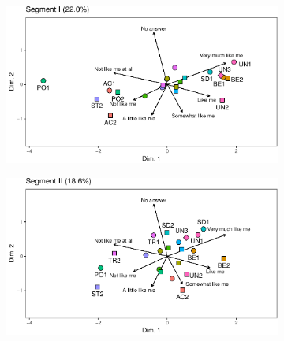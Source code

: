 \documentclass[12pt,letter]{article}\usepackage[]{graphicx}\usepackage[]{xcolor}
\begin{document}
\begin{figure}
\begin{subfigure}{.5\textwidth}
   \includegraphics[width=\textwidth]{figures/Paper-biplots-1-edit2}
\end{subfigure}
\hfill
\begin{subfigure}{.5\textwidth}
   \includegraphics[width=\textwidth]{figures/Paper-biplots-2-edit2}
\end{subfigure} 


\end{figure}
\end{document}
